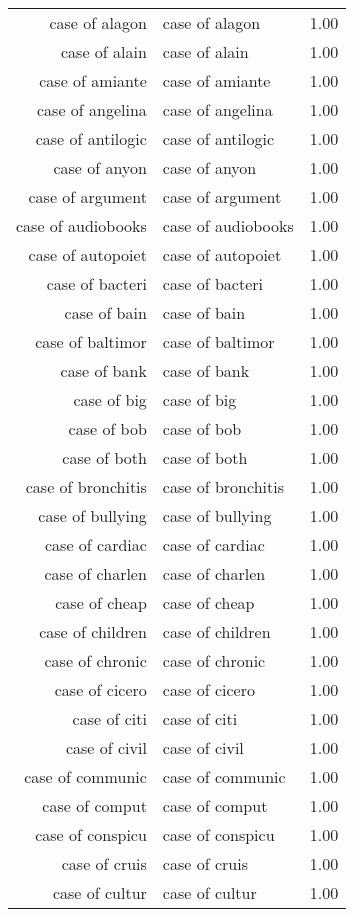 \begin{table}[ht]
\begin{tabular}{rlr}
  case of alagon & case of alagon & 1.00 \\ 
  case of alain & case of alain & 1.00 \\ 
  case of amiante & case of amiante & 1.00 \\ 
  case of angelina & case of angelina & 1.00 \\ 
  case of antilogic & case of antilogic & 1.00 \\ 
  case of anyon & case of anyon & 1.00 \\ 
  case of argument & case of argument & 1.00 \\ 
  case of audiobooks & case of audiobooks & 1.00 \\ 
  case of autopoiet & case of autopoiet & 1.00 \\ 
  case of bacteri & case of bacteri & 1.00 \\ 
  case of bain & case of bain & 1.00 \\ 
  case of baltimor & case of baltimor & 1.00 \\ 
  case of bank & case of bank & 1.00 \\ 
  case of big & case of big & 1.00 \\ 
  case of bob & case of bob & 1.00 \\ 
  case of both & case of both & 1.00 \\ 
  case of bronchitis & case of bronchitis & 1.00 \\ 
  case of bullying & case of bullying & 1.00 \\ 
  case of cardiac & case of cardiac & 1.00 \\ 
  case of charlen & case of charlen & 1.00 \\ 
  case of cheap & case of cheap & 1.00 \\ 
  case of children & case of children & 1.00 \\ 
  case of chronic & case of chronic & 1.00 \\ 
  case of cicero & case of cicero & 1.00 \\ 
  case of citi & case of citi & 1.00 \\ 
  case of civil & case of civil & 1.00 \\ 
  case of communic & case of communic & 1.00 \\ 
  case of comput & case of comput & 1.00 \\ 
  case of conspicu & case of conspicu & 1.00 \\ 
  case of cruis & case of cruis & 1.00 \\ 
  case of cultur & case of cultur & 1.00 \\ 

\end{tabular}
\end{table}
